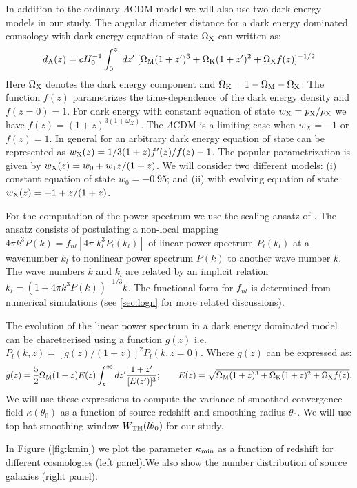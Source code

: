 \documentclass[usenatbib]{mn2e}
\def\be{\begin{equation}}
\def\ee{\end{equation}}
\def\be{\begin{equation}}
\def\ee{\end{equation}}
\begin{document}
In addition to the ordinary $\Lambda$CDM model we will also use two dark energy models in our study. 
The angular diameter distance for a dark energy dominated comsology with dark energy equation of state  $\Omega_{\rm X}$ 
can written as:
\be
d_{\rm A}(z) = cH_0^{-1}\int_0^z\; dz'\; [ \Omega_{\rm M}(1+z')^3 + \Omega_{\rm K}(1+z')^2 + \Omega_{\rm X} f(z)]^{-1/2}
\ee
Here $\Omega_{\rm X}$ denotes the dark energy component and $\Omega_{\rm K} = 1-\Omega_{\rm M} -\Omega_{\rm X}$. The function $f(z)$ parametrizes 
the time-dependence of the dark energy density and $f(z=0)=1$. For dark energy with
constant equation of state $w_{\rm X} = p_{\rm X}/\rho_{\rm X}$ we have $f(z) = (1+z)^{3(1+\omega_X)}$. The $\Lambda$CDM is
a limiting case when $w_X=-1$ or $f(z)=1$. In general for  an arbitrary dark energy equation of state
can be represented as \citep{WaGa01} $w_{\rm X}(z) = {1 /3}(1+z)f'(z)/f(z)-1$. The popular parametrization is given 
by $w_{\rm X}(z)=w_0 + w_1 z/(1+z)$. We will consider two different models: (i) constant equation of state $w_0=-0.95$; and
(ii) with evolving equation of state $w_{\rm X}(z)=-1 + {z/(1+ z)}$. 

For the computation of the power spectrum we use the scaling ansatz of \citep{PD94}. The ansatz
consists of postulating a non-local mapping $4\pi k^3P(k) = f_{nl}[4\pi\;k_l^3 P_l(k_l)]$
of linear power spectrum  $P_l(k_l)$ at a wavenumber $k_l$ to nonlinear power spectrum $P(k)$
to another wave number $k$. The wave numbers $k$ and $k_l$ are related by an implicit relation $k_l=(1+4\pi k^3 P(k))^{-1/3}k$.  
The functional form for $f_{nl}$ is determined from numerical simulations (see \textsection\ref{sec:logn} for more related discussions).

The evolution of the linear power spectrum in a dark energy dominated model can be charetcerised using a function $g(z)$ 
i.e. $P_l(k,z)= [g(z)/(1+z)]^2 P_l(k,z=0)$. Where $g(z)$ can be expressed as:
\be 
g(z) = {5 \over 2}\Omega_{\rm M}(1+z)E(z)\int_z^{\infty} dz' {1+z' \over [E(z')]^3}; \quad\quad
E(z) = \sqrt{ \Omega_{\rm M}(1+z)^3 + \Omega_{\rm K}(1+z)^2 + \Omega_{\rm X} f(z)}.
\ee
We will use these expressions to compute the variance of smoothed convergence field $\kappa(\theta_0)$ as a function of source redshift
and smoothing radius $\theta_0$. We will use top-hat smoothing window  $W_{\rm TH}(l\theta_0)$ for our study.

In Figure (\ref{fig:kmin}) we plot the parameter $\kappa_{\rm min}$ as a function of redshift for different cosmologies (left panel).We also show the number distribution of source galaxies (right panel). 
%
\end{document}
